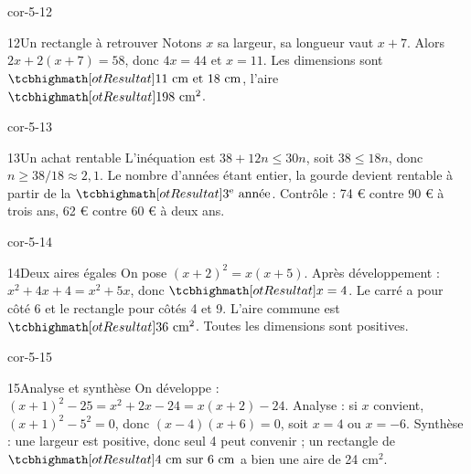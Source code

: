 \begin{blocLivre}{cor-5-12}\begin{corrige}{12}{Un rectangle à retrouver}
Notons $x$ sa largeur, sa longueur vaut $x+7$. Alors $2x+2(x+7)=58$, donc $4x=44$ et $x=11$. Les dimensions sont $\res{11\text{ cm et }18\text{ cm}}$, l’aire $\res{198\text{ cm}^2}$.
\label{fig-cor-5-12}
\end{corrige}\end{blocLivre}
\begin{blocLivre}{cor-5-13}\begin{corrige}{13}{Un achat rentable}
L’inéquation est $38+12n\le30n$, soit $38\le18n$, donc $n\ge38/18\approx2{,}1$. Le nombre d’années étant entier, la gourde devient rentable à partir de la $\res{3^{\text{e}}\text{ année}}$. Contrôle : 74 € contre 90 € à trois ans, 62 € contre 60 € à deux ans.
\end{corrige}\end{blocLivre}
\begin{blocLivre}{cor-5-14}\begin{corrige}{14}{Deux aires égales}
On pose $(x+2)^2=x(x+5)$. Après développement : $x^2+4x+4=x^2+5x$, donc $\res{x=4}$. Le carré a pour côté 6 et le rectangle pour côtés 4 et 9. L’aire commune est $\res{36\text{ cm}^2}$. Toutes les dimensions sont positives.
\label{fig-cor-5-14}
\end{corrige}\end{blocLivre}
\begin{blocLivre}{cor-5-15}\begin{corrige}{15}{Analyse et synthèse}
On développe : $(x+1)^2-25=x^2+2x-24=x(x+2)-24$. Analyse : si $x$ convient, $(x+1)^2-5^2=0$, donc $(x-4)(x+6)=0$, soit $x=4$ ou $x=-6$. Synthèse : une largeur est positive, donc seul 4 peut convenir ; un rectangle de $\res{4\text{ cm sur }6\text{ cm}}$ a bien une aire de 24 cm$^2$.
\end{corrige}\end{blocLivre}

